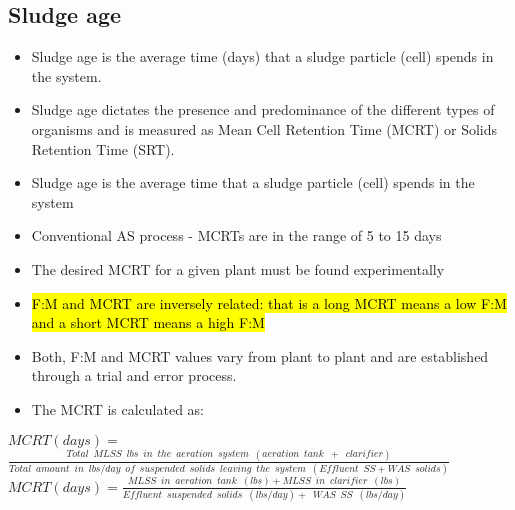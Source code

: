 \subsection{Sludge age}

\begin{itemize}
\item Sludge age is the average time (days) that a sludge particle (cell) spends in the system.  \item Sludge age dictates the presence and predominance of the different types of organisms and is measured as Mean Cell Retention Time (MCRT) or Solids Retention Time (SRT).\\
\item Sludge age is the average time that a sludge particle (cell) spends in the system
\item Conventional AS process - MCRTs are in the range of 5 to 15 days
\item The desired MCRT for a given plant must be found experimentally
\item \hl{F:M and MCRT are inversely related: that is a long MCRT means a low F:M and a short MCRT means a high F:M} 
\item Both, F:M and MCRT values vary from plant to plant and are established through a trial and error process.
\item The MCRT is calculated as:\\ 
\end{itemize}

\vspace{0.2cm}
$MCRT(days) = $\\
$\frac{Total \enspace MLSS \enspace lbs \enspace in \enspace the \enspace aeration \enspace system \enspace (aeration \enspace tank \enspace + \enspace clarifier)}{Total \enspace amount \enspace in \enspace lbs/day \enspace of \enspace suspended \enspace solids \enspace leaving  \enspace the \enspace system \enspace(Effluent\enspace SS+ WAS \enspace solids)}$\\
\vspace{0.4cm} 
$MCRT (days) = \frac{MLSS \enspace in \enspace aeration \enspace tank \enspace (lbs)+MLSS \enspace in \enspace clarifier \enspace (lbs)}{Effluent \enspace suspended \enspace solids \enspace (lbs/day)+\enspace WAS \enspace SS \enspace (lbs/day)}$

